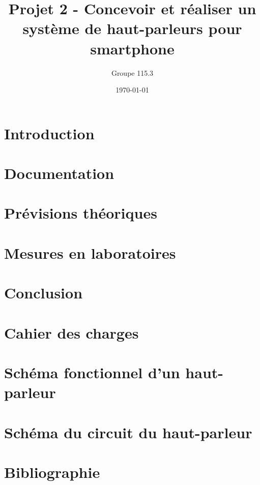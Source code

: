 \documentclass{report}
\title{Projet 2 - Concevoir et réaliser un système de haut-parleurs pour smartphone}
\author{Groupe 115.3}
\date{\today}
\begin{document}
\maketitle

\chapter{Introduction}

\chapter{Documentation}

\chapter{Prévisions théoriques}

\chapter{Mesures en laboratoires}

\chapter{Conclusion}

\appendix
\chapter{Cahier des charges}

\chapter{Schéma fonctionnel d'un haut-parleur}

\chapter{Schéma du circuit du haut-parleur}

\chapter{Bibliographie}
\end{document}
